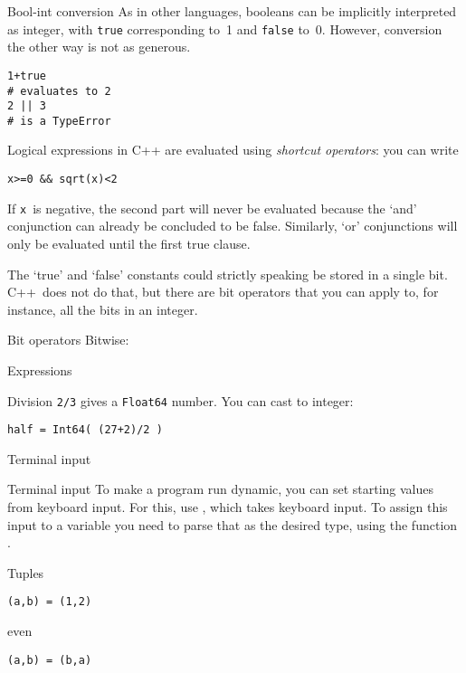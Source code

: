 \begin{block}{Bool-int conversion}
  As in other languages, booleans can be implicitly interpreted as
  integer, with \lstinline{true} corresponding to~1 and
  \lstinline{false} to~0. However, conversion the other way is not as
  generous.
\begin{lstlisting}
1+true
# evaluates to 2
2 || 3
# is a TypeError
\end{lstlisting}
\end{block}

Logical expressions in C++ are evaluated using
\emph{shortcut operators}: you can write
\begin{lstlisting}
x>=0 && sqrt(x)<2
\end{lstlisting}
If \lstinline{x}~is negative, the second part will never be evaluated because
the `and' conjunction can already be concluded to be false.
Similarly, `or' conjunctions will only be evaluated until the first
true clause.

The `true' and `false' constants could strictly speaking be stored in
a single bit. C++~does not do that, but there are bit
operators that you can apply to, for instance, all the bits in an integer.

\begin{block}{Bit operators}
  \label{sl:bit-operj}
 Bitwise: \n{& | ^}
\end{block}

 {Expressions}

Division \lstinline{2/3} gives a \lstinline{Float64} number.
You can cast to integer:
\begin{lstlisting}
half = Int64( (27+2)/2 )
\end{lstlisting}

 {Terminal input}

\begin{block}{Terminal input}
  \label{sl:cinj}
  To make a program run dynamic, you can set starting values from
  keyboard input. For this, use , which takes
  keyboard input. To assign this input to a variable you need to parse
  that as the desired type, using the function .

\end{block}

 {Tuples}

\begin{lstlisting}
(a,b) = (1,2)
\end{lstlisting}
even
\begin{lstlisting}
(a,b) = (b,a)
\end{lstlisting}
